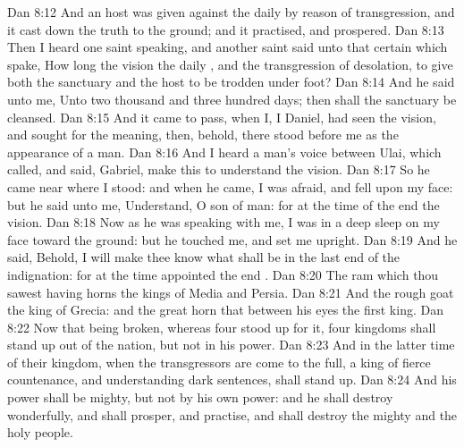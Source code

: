 \vs Dan 8:12 And an host was given  against the daily  by reason of transgression, and it cast down the truth to the ground; and it practised, and prospered.
\vs Dan 8:13 Then I heard one saint speaking, and another saint said unto that certain  which spake, How long  the vision  the daily , and the transgression of desolation, to give both the sanctuary and the host to be trodden under foot?
\vs Dan 8:14 And he said unto me, Unto two thousand and three hundred days; then shall the sanctuary be cleansed.
\vs Dan 8:15 And it came to pass, when I,  I Daniel, had seen the vision, and sought for the meaning, then, behold, there stood before me as the appearance of a man.
\vs Dan 8:16 And I heard a man's voice between  Ulai, which called, and said, Gabriel, make this  to understand the vision.
\vs Dan 8:17 So he came near where I stood: and when he came, I was afraid, and fell upon my face: but he said unto me, Understand, O son of man: for at the time of the end  the vision.
\vs Dan 8:18 Now as he was speaking with me, I was in a deep sleep on my face toward the ground: but he touched me, and set me upright.
\vs Dan 8:19 And he said, Behold, I will make thee know what shall be in the last end of the indignation: for at the time appointed the end .
\vs Dan 8:20 The ram which thou sawest having  horns  the kings of Media and Persia.
\vs Dan 8:21 And the rough goat  the king of Grecia: and the great horn that  between his eyes  the first king.
\vs Dan 8:22 Now that being broken, whereas four stood up for it, four kingdoms shall stand up out of the nation, but not in his power.
\vs Dan 8:23 And in the latter time of their kingdom, when the transgressors are come to the full, a king of fierce countenance, and understanding dark sentences, shall stand up.
\vs Dan 8:24 And his power shall be mighty, but not by his own power: and he shall destroy wonderfully, and shall prosper, and practise, and shall destroy the mighty and the holy people.
